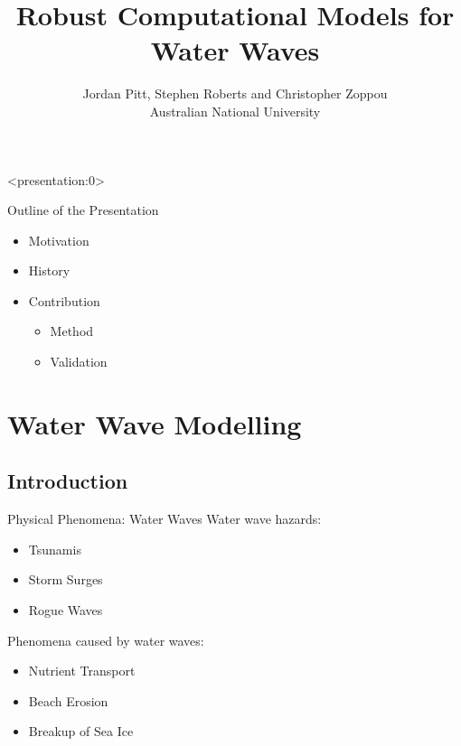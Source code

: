\documentclass[handout]{beamer}
\title{Robust Computational Models for Water Waves}
\author{Jordan Pitt, Stephen Roberts and Christopher Zoppou \\ Australian National University}
\begin{document}
	\begin{frame}<presentation:0>
		\cite{Zoppou-2014} \cite{Pitt-2018-61}
	\end{frame}
\begin{frame}
\titlepage
\end{frame}
\begin{frame}{Outline of the Presentation}
	
	\begin{itemize}
		\item Motivation
		\item History
		\item Contribution 
		\begin{itemize}
			\item Method
			\item Validation
		\end{itemize}
	\end{itemize}
	
\end{frame}

\section{Water Wave Modelling}
\subsection{Introduction}

\begin{frame}{Physical Phenomena: Water Waves}
	Water wave hazards:
	\begin{itemize}
		\item Tsunamis
		\item Storm Surges
		\item Rogue Waves
	\end{itemize}
	\smallskip
	\pause
	Phenomena caused by water waves:
	\begin{itemize}
		\item Nutrient Transport
		\item Beach Erosion
		\item Breakup of Sea Ice
	\end{itemize}
\end{frame}
\end{document}
